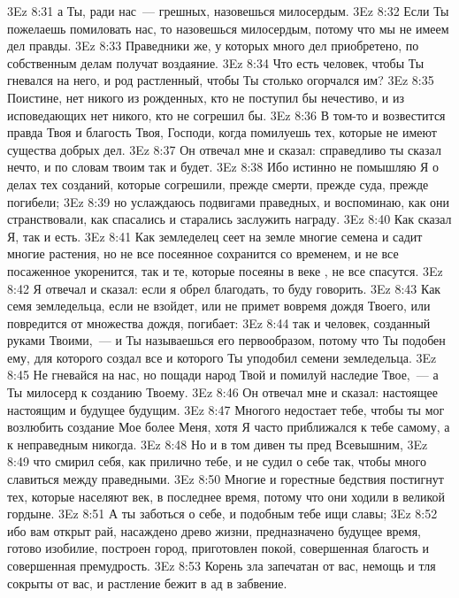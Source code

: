 \vs 3Ez 8:31 а Ты, ради нас~--- грешных, назовешься милосердым.
\vs 3Ez 8:32 Если Ты пожелаешь помиловать нас, то назовешься милосердым, потому что мы не имеем дел правды.
\vs 3Ez 8:33 Праведники же, у которых много дел приобретено, по собственным делам получат воздаяние.
\vs 3Ez 8:34 Что есть человек, чтобы Ты гневался на него, и род растленный, чтобы Ты столько огорчался им?
\vs 3Ez 8:35 Поистине, нет никого из рожденных, кто не поступил бы нечестиво, и из исповедающих  нет никого, кто не согрешил бы.
\vs 3Ez 8:36 В том-то и возвестится правда Твоя и благость Твоя, Господи, когда помилуешь тех, которые не имеют существа добрых дел.
\vs 3Ez 8:37 Он отвечал мне и сказал: справедливо ты сказал нечто, и по словам твоим так и будет.
\vs 3Ez 8:38 Ибо истинно не помышляю Я о делах тех созданий, которые согрешили, прежде смерти, прежде суда, прежде погибели;
\vs 3Ez 8:39 но услаждаюсь подвигами праведных, и воспоминаю, как они странствовали, как спасались и старались заслужить награду.
\vs 3Ez 8:40 Как сказал Я, так и есть.
\vs 3Ez 8:41 Как земледелец сеет на земле многие семена и садит многие растения, но не все посеянное сохранится со временем, и не все посаженное укоренится, так и те, которые посеяны в веке , не все спасутся.
\vs 3Ez 8:42 Я отвечал и сказал: если я обрел благодать, то буду говорить.
\vs 3Ez 8:43 Как семя земледельца, если не взойдет, или не примет вовремя дождя Твоего, или повредится от множества дождя, погибает:
\vs 3Ez 8:44 так и человек, созданный руками Твоими,~--- и Ты называешься его первообразом, потому что Ты подобен ему, для которого создал все и которого Ты уподобил семени земледельца.
\vs 3Ez 8:45 Не гневайся на нас, но пощади народ Твой и помилуй наследие Твое,~--- а Ты милосерд к созданию Твоему.
\vs 3Ez 8:46 Он отвечал мне и сказал: настоящее настоящим и будущее будущим.
\vs 3Ez 8:47 Многого недостает тебе, чтобы ты мог возлюбить создание Мое более Меня, хотя Я часто приближался к тебе самому, а к неправедным никогда.
\vs 3Ez 8:48 Но и в том дивен ты пред Всевышним,
\vs 3Ez 8:49 что смирил себя, как прилично тебе, и не судил о себе так, чтобы много славиться между праведными.
\vs 3Ez 8:50 Многие и горестные бедствия постигнут тех, которые населяют век, в последнее время, потому что они ходили в великой гордыне.
\vs 3Ez 8:51 А ты заботься о себе, и подобным тебе ищи славы;
\vs 3Ez 8:52 ибо вам открыт рай, насаждено древо жизни, предназначено будущее время, готово изобилие, построен город, приготовлен покой, совершенная благость и совершенная премудрость.
\vs 3Ez 8:53 Корень зла запечатан от вас, немощь и тля сокрыты от вас, и растление бежит в ад в забвение.
